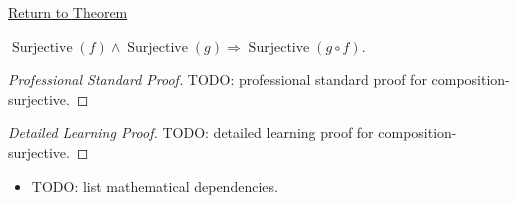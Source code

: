 \newpage
{}
\label{prf:composition-surjective}

\begin{remark*}[Return]
\hyperref[prop:composition-surjective]{Return to Theorem}
\end{remark*}

\begin{theorem*}
$\operatorname{Surjective}(f)\wedge\operatorname{Surjective}(g)
\Rightarrow\operatorname{Surjective}(g\circ f)$.

\smallskip\noindent
\end{theorem*}

\begin{proof}[Professional Standard Proof]
\LRAProofBodyStart
TODO: professional standard proof for composition-surjective.
\end{proof}

\begin{proof}[Detailed Learning Proof]
\LRAProofBodyStart
TODO: detailed learning proof for composition-surjective.
\end{proof}

\begin{remark*}
\end{remark*}

\begin{dependencies}
\begin{itemize}
  \item TODO: list mathematical dependencies.
\end{itemize}
\end{dependencies}

\clearpage
